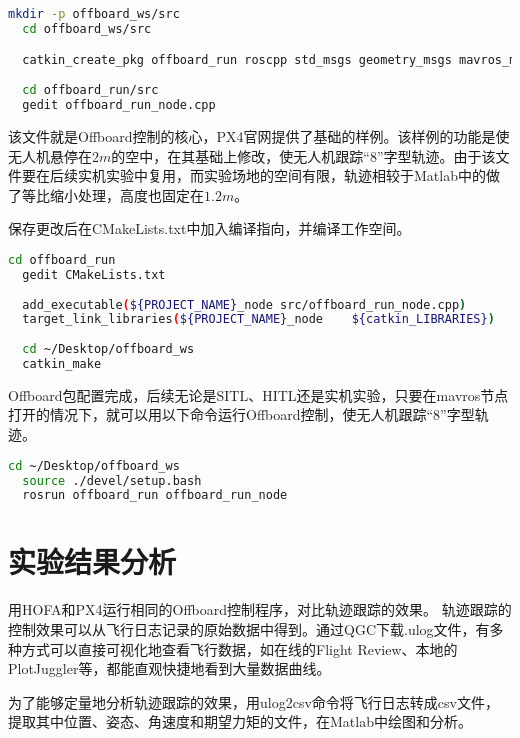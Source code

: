 \begin{lstlisting}[language=Bash, basicstyle=\footnotesize, linewidth=\linewidth, breaklines=true]
  mkdir -p offboard_ws/src
  cd offboard_ws/src

  catkin_create_pkg offboard_run roscpp std_msgs geometry_msgs mavros_msgs
  
  cd offboard_run/src
  gedit offboard_run_node.cpp
\end{lstlisting}

该文件就是Offboard控制的核心，PX4官网提供了基础的样例\cite{Offboard}。该样例的功能是使无人机悬停在$2m$的空中，在其基础上修改，使无人机跟踪“8”字型轨迹。由于该文件要在后续实机实验中复用，而实验场地的空间有限，轨迹相较于Matlab中的做了等比缩小处理，高度也固定在$1.2m$。

保存更改后在CMakeLists.txt中加入编译指向，并编译工作空间。

\begin{lstlisting}[language=Bash, basicstyle=\footnotesize, linewidth=\linewidth, breaklines=true]
  cd offboard_run
  gedit CMakeLists.txt
  
  add_executable(${PROJECT_NAME}_node src/offboard_run_node.cpp)
  target_link_libraries(${PROJECT_NAME}_node    ${catkin_LIBRARIES})
  
  cd ~/Desktop/offboard_ws
  catkin_make
\end{lstlisting}
  
Offboard包配置完成，后续无论是SITL、HITL还是实机实验，只要在mavros节点打开的情况下，就可以用以下命令运行Offboard控制，使无人机跟踪“8”字型轨迹。

\begin{lstlisting}[language=Bash, basicstyle=\footnotesize, linewidth=\linewidth, breaklines=true]
  cd ~/Desktop/offboard_ws
  source ./devel/setup.bash
  rosrun offboard_run offboard_run_node
\end{lstlisting}

\section{实验结果分析}
用HOFA和PX4运行相同的Offboard控制程序，对比轨迹跟踪的效果。
轨迹跟踪的控制效果可以从飞行日志记录的原始数据中得到。通过QGC下载.ulog文件，有多种方式可以直接可视化地查看飞行数据，如在线的Flight Review、本地的PlotJuggler等，都能直观快捷地看到大量数据曲线。

为了能够定量地分析轨迹跟踪的效果，用ulog2csv命令将飞行日志转成csv文件，提取其中位置、姿态、角速度和期望力矩的文件，在Matlab中绘图和分析。

